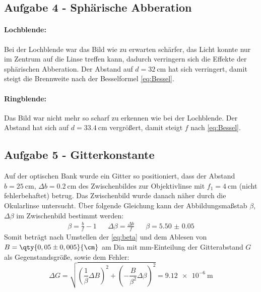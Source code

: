 \subsection{Aufgabe 4 - Sphärische Abberation}
\paragraph{Lochblende:}
Bei der Lochblende war das Bild wie zu erwarten schärfer, das Licht konnte nur im Zentrum
auf die Linse treffen kann, dadurch verringern sich die Effekte der sphärischen Abberation. Der Abstand auf \(d=\qty{32}{\cm}\) hat sich verringert, damit steigt die Brennweite nach der Besselformel \cref{eq:Bessel}. 
\paragraph{Ringblende:}
Das Bild war nicht mehr so scharf zu erkennen wie bei der Lochblende. Der Abstand hat sich auf \(d=\qty{33,4}{\cm}\) vergrößert, damit steigt \(f\) nach \cref{eq:Bessel}.

\subsection{Aufgabe 5 - Gitterkonstante}
Auf der optischen Bank wurde ein Gitter so positioniert, dass der Abstand \(b=\qty{25}{\cm}\), \(\Delta b=\qty{0,2}{\cm}\) des Zwischenbildes zur Objektivlinse mit \(f_1=\qty{4}{\cm}\) (nicht fehlerbehaftet) betrug. Das Zwischenbild wurde danach näher durch die Okularlinse untersucht.
Über folgende Gleichung kann der Abbildungsmaßstab \(\beta\), \(\Delta \beta\) im Zwischenbild bestimmt werden:
\begin{align}
    \beta = \frac{b}{f} - 1 && \Delta \beta = \frac{\Delta b}{f} && \beta=\num{5.50(5)}
\end{align}
Somit beträgt nach Umstellen der \cref{eq:beta} und dem Ablesen von \(B=\qty{0,05 \pm 0,005}{\cm}\) am Dia mit mm-Einteilung der Gitterabstand \(G\) als Gegenstandsgröße, sowie dem Fehler: 
\begin{equation}
    \Delta G = \sqrt{\left( \frac{1}{\beta} \Delta B \right)^2+ \left( -\frac{B}{\beta^2} \Delta \beta \right)^2}=\qty{9,12 e-6}{\m}
\end{equation}


